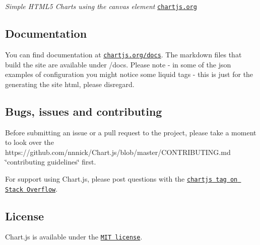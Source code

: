 \href{https://travis-ci.org/nnnick/Chart.js}{\tt } \href{https://codeclimate.com/github/nnnick/Chart.js}{\tt }

{\itshape Simple H\+T\+M\+L5 Charts using the canvas element} \href{http://www.chartjs.org}{\tt chartjs.\+org}

\subsection*{Documentation}

You can find documentation at \href{http://www.chartjs.org/docs/}{\tt chartjs.\+org/docs}. The markdown files that build the site are available under {\ttfamily /docs}. Please note -\/ in some of the json examples of configuration you might notice some liquid tags -\/ this is just for the generating the site html, please disregard.

\subsection*{Bugs, issues and contributing}

Before submitting an issue or a pull request to the project, please take a moment to look over the https\+://github.com/nnnick/\+Chart.\+js/blob/master/\+C\+O\+N\+T\+R\+I\+B\+U\+T\+I\+NG.md \char`\"{}contributing guidelines\char`\"{} first.

For support using Chart.\+js, please post questions with the \href{http://stackoverflow.com/questions/tagged/chartjs}{\tt {\ttfamily chartjs} tag on Stack Overflow}.

\subsection*{License}

Chart.\+js is available under the \href{http://opensource.org/licenses/MIT}{\tt M\+IT license}. 